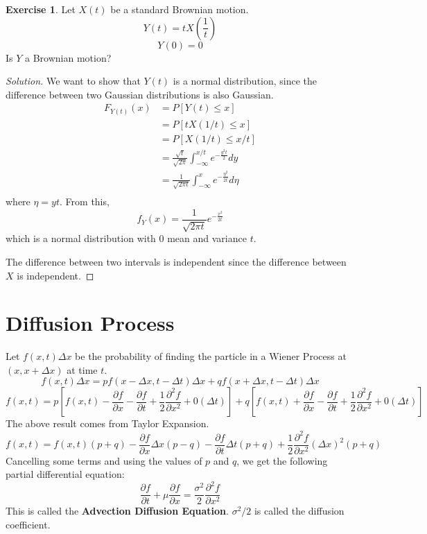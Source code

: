 \documentclass[12pt,letterpaper]{book}
\theoremstyle{definition}
\newtheorem*{exercise}{Exercise}
\newenvironment{solution}
  {\renewcommand\qedsymbol{$\blacksquare$}\begin{proof}[Solution]}
  {\end{proof}}
\begin{document}
\begin{exercise}
  Let $X(t)$ be a standard Brownian motion.
  \[Y(t) = t X \left(\frac{1}{t} \right)\]
  \[Y(0) = 0\]
  Is $Y$ a Brownian motion?
\end{exercise}
\begin{solution}
  We want to show that $Y(t)$ is a normal distribution, since the difference between two Gaussian distributions is also Gaussian.
  \begin{align*}
    F_{Y(t)} (x) &= P[Y(t) \leq x] \\
                 &= P[tX(1/t) \leq x] \\
                 &= P[X(1/t) \leq x/t]\\
                 &= \frac{\sqrt t}{\sqrt{2 \pi}}\int_{-\infty}^{x/t} e^{-\frac{y^2t}{2}} dy \\
                 &= \frac{1}{\sqrt{2 \pi t}} \int_{-\infty}^{x} e^{-\frac{\eta^2}{2t}} d \eta \\
  \end{align*}
  where $\eta = yt$. From this,
  \[f_Y(x) = \frac{1}{\sqrt{2 \pi t}} e^{-\frac{x^2}{2t}}\]
  which is a normal distribution with 0 mean and variance $t$.

  The difference between two intervals is independent since the difference between $X$ is independent.
\end{solution}

\section{Diffusion Process}

Let $f(x,t) \Delta x$ be the probability of finding the particle in a Wiener Process at $(x, x+ \Delta x)$ at time $t$.
\[f(x,t) \Delta x = p f(x - \Delta x, t - \Delta t) \Delta x + q f(x + \Delta x, t - \Delta t) \Delta x\]
\[f(x,t) = p \left[f(x,t) - \frac{\partial f}{\partial x} - \frac{\partial f}{\partial t} + \frac{1}{2} \frac{\partial ^ 2 f}{\partial x^2} + 0 (\Delta t) \right] + q\left[f(x,t) + \frac{\partial f}{\partial x} - \frac{\partial f}{\partial t} + \frac{1}{2} \frac{\partial ^ 2 f}{\partial x^2} + 0 (\Delta t) \right]  \]
The above result comes from Taylor Expansion.
\[f(x,t) = f(x,t)(p+q) - \frac{\partial f}{\partial x} \Delta x (p-q) - \frac{\partial f}{\partial t} \Delta t (p+q) + \frac{1}{2} \frac{\partial^2 f}{\partial x^2} (\Delta x)^2 (p+q) \]
Cancelling some terms and using the values of $p$ and $q$, we get the following partial differential equation:
\[\frac{\partial f}{\partial t} + \mu \frac{\partial f}{\partial x} = \frac{\sigma^2}{2} \frac{\partial^2 f}{\partial x^2}\]
This is called the \textbf{Advection Diffusion Equation}. $\sigma^2/2$ is called the diffusion coefficient.
\end{document}

